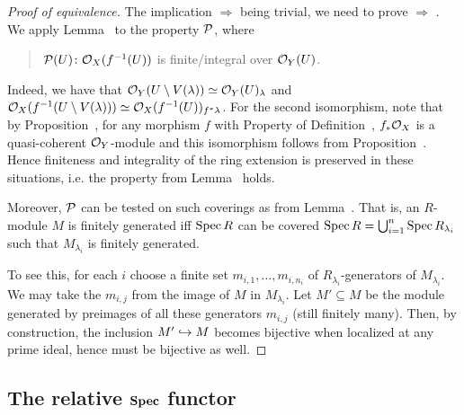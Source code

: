 \documentclass[a4paper,parskip=half,numbers=enddot, DIV=12]{scrreprt}
\begin{document}
\begin{proof}[Proof of equivalence]
	The implication  $\Rightarrow$  being trivial, we need to prove  $\Rightarrow$ . We apply Lemma~ to the property $\mathcal{P}$, where
	\begin{quote}
		$\mathcal{P}(U)\colon\mathcal{O}_X(f^{-1}(U))$ is finite/integral over $\mathcal{O}_Y(U)$.
	\end{quote}
	Indeed, we have that $\mathcal{O}_Y(U\setminus V(\lambda))\simeq \mathcal{O}_Y(U)_\lambda$ and $\mathcal{O}_X(f^{-1}(U\setminus V(\lambda))) \simeq \mathcal{O}_X(f^{-1}(U))_{f^*\lambda}$. For the second isomorphism, note that by Proposition~, for any morphism $f$ with Property  of Definition~, $f_*\mathcal{O}_X$ is a quasi-coherent $\mathcal{O}_Y$-module and this isomorphism follows from Proposition~. Hence finiteness and integrality of the ring extension is preserved in these situations, i.e. the property from Lemma~\itememph{\alpha} holds. 
	
	Moreover, $\mathcal{P}$ can be tested on such coverings as from Lemma~\itememph{\beta}. That is, an $R$-module $M$ is finitely generated iff $\operatorname{Spec} R$ can be covered $\operatorname{Spec} R = \bigcup_{i=1}^n \operatorname{Spec} R_{\lambda_i}$ such that $M_{\lambda_i}$ is finitely generated. 
	
	To see this, for each $i$ choose a finite set $m_{i,1},\ldots,m_{i,n_i}$ of $R_{\lambda_i}$-generators of $M_{\lambda_i}$. We may take the $m_{i,j}$ from the image of $M$ in $M_{\lambda_i}$. Let $M'\subseteq M$ be the module generated by preimages of all these generators $m_{i,j}$ (still finitely many). Then, by construction, the inclusion $M'\monomorphism M$ becomes bijective when localized at any prime ideal, hence must be bijective as well.
\end{proof}
\subsection{The relative \texorpdfstring{$\operatorname{\mathbf{Spec}}$}{Spec} functor}
\end{document}
